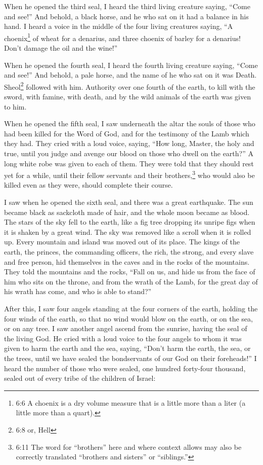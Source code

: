 \myverse{}When he opened the third seal, I heard the third living creature
saying, “Come and see!” And behold, a black horse, and he who sat on it had a balance in his hand.
\myverse{}I heard a voice in the middle of the four living creatures saying, “A choenix\footnote{6:6 A choenix is a dry volume measure that is a little more than a liter (a little more than a quart).}
of wheat for a denarius, and three choenix of barley for a denarius! Don’t damage the oil and the wine!”

\myverse{}When he opened the fourth seal, I heard the fourth living creature
saying, “Come and see!”
\myverse{}And behold, a pale horse, and the name of he who sat on it was Death. Sheol\footnote{6:8 or, Hell} followed with him. Authority over one fourth of the earth, to kill with the
sword, with famine, with death, and by the wild animals of the earth was given to him.

\myverse{}When he opened the fifth seal, I saw underneath the altar the souls
of those who had been killed for the Word of God, and for the testimony of the Lamb which they had.
\myverse{}They cried with a loud voice, saying, “How long, Master, the holy and true,
until you judge and avenge our blood on those who dwell on the earth?”
\myverse{}A long white robe was given to each of them. They were told that they should
rest yet for a while, until their fellow servants and their brothers,\footnote{6:11 The word for “brothers” here and where context allows may also be correctly translated “brothers
	and sisters” or “siblings.”} who would also be killed even as they were, should complete their
course.

\myverse{}I saw when he opened the sixth seal, and there was a great earthquake.
The sun became black as sackcloth made of hair, and the whole moon became as blood.
\myverse{}The stars of the sky fell to the earth, like a fig tree dropping its unripe
figs when it is shaken by a great wind.
\myverse{}The sky was removed like a scroll when it is rolled up. Every mountain and
island was moved out of its place.
\myverse{}The kings of the earth, the princes, the commanding officers, the rich, the
strong, and every slave and free person, hid themselves in the caves and in the rocks of the mountains.
\myverse{}They told the mountains and the rocks, “Fall on us, and hide us from the face
of him who sits on the throne, and from the wrath of the Lamb,
\myverse{}for the great day of his wrath has come, and who is able to stand?”



\mychapter{} \myverse*{}After this, I saw four angels standing at the four corners of the
earth, holding the four winds of the earth, so that no wind would blow on the earth, or on the sea, or
on any tree.
\myverse{}I saw another angel ascend from the sunrise, having the seal of the living God.
He cried with a loud voice to the four angels to whom it was given to harm the earth and the sea,
\myverse{}saying, “Don’t harm the earth, the sea, or the trees, until we have sealed the
bondservants of our God on their foreheads!”
\myverse{}I heard the number of those who were sealed, one hundred forty-four thousand,
sealed out of every tribe of the children of Israel:

